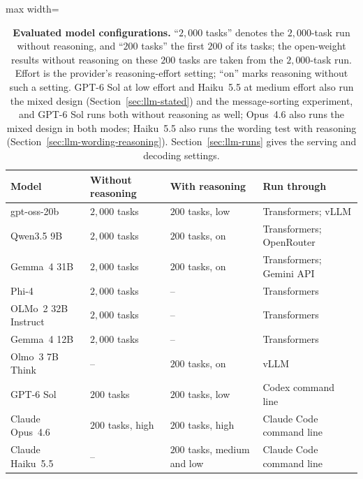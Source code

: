 \begin{table}[htbp]
\centering\small
\setlength{\tabcolsep}{4pt}
\caption[Evaluated model configurations]{\textbf{Evaluated model configurations.} ``$2{,}000$ tasks'' denotes the $2{,}000$-task run without reasoning, and ``$200$ tasks'' the first $200$ of its tasks; the open-weight results without reasoning on these $200$ tasks are taken from the $2{,}000$-task run. Effort is the provider's reasoning-effort setting; ``on'' marks reasoning without such a setting. GPT-6 Sol at low effort and Haiku~5.5 at medium effort also run the mixed design (Section~\ref{sec:llm-stated}) and the message-sorting experiment, and GPT-6 Sol runs both without reasoning as well; Opus~4.6 also runs the mixed design in both modes; Haiku~5.5 also runs the wording test with reasoning (Section~\ref{sec:llm-wording-reasoning}). Section~\ref{sec:llm-runs} gives the serving and decoding settings.}
\label{tab:llm-configs}
\vspace{3pt}
\begin{adjustbox}{max width=\textwidth}
\begin{tabular}{llll}
\toprule
Model & Without reasoning & With reasoning & Run through \\
\midrule
gpt-oss-20b & $2{,}000$ tasks & $200$ tasks, low & Transformers; vLLM \\
Qwen3.5 9B & $2{,}000$ tasks & $200$ tasks, on & Transformers; OpenRouter \\
Gemma~4 31B & $2{,}000$ tasks & $200$ tasks, on & Transformers; Gemini API \\
Phi-4 & $2{,}000$ tasks & -- & Transformers \\
OLMo~2 32B Instruct & $2{,}000$ tasks & -- & Transformers \\
Gemma~4 12B & $2{,}000$ tasks & -- & Transformers \\
Olmo~3 7B Think & -- & $200$ tasks, on & vLLM \\
GPT-6 Sol & $200$ tasks & $200$ tasks, low & Codex command line \\
Claude Opus~4.6 & $200$ tasks, high & $200$ tasks, high & Claude Code command line \\
Claude Haiku~5.5 & -- & $200$ tasks, medium and low & Claude Code command line \\
\bottomrule
\end{tabular}
\end{adjustbox}
\end{table}

